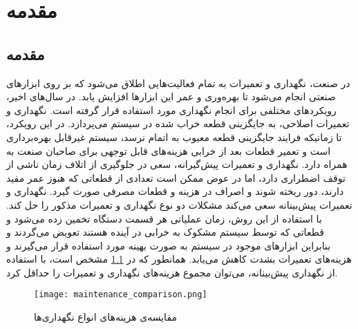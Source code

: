 \chapter{مقدمه}

\section{مقدمه}
در صنعت، نگهداری و تعمیرات به تمام فعالیت‌هایی اطلاق می‌شود که بر روی ابزارهای صنعتی انجام می‌شود تا بهره‌وری و عمر این ابزارها افزایش یابد. در سال‌های اخیر، رویکردهای مختلفی برای انجام نگهداری مورد استفاده قرار گرفته است. نگهداری و تعمیرات اصلاحی، به جایگزینی قطعه خراب شده در سیستم می‌پردازد. در این رویکرد، تا زمانیکه فرایند جایگزینی قطعه معیوب به اتمام نرسد، سیستم غیرقابل بهره‌برداری است و تعمیر قطعات بعد از خرابی هزینه‌های قابل توجهی برای صاحبان صنعت به همراه دارد. نگهداری و تعمیرات پیش‌گیرانه، سعی در جلوگیری از اتلاف زمان ناشی از توقف اضطراری دارد، اما در عوض ممکن است تعدادی از قطعاتی که هنوز عمر مفید دارند، دور ریخته شوند و اصراف در هزینه و قطعات مصرفی صورت گیرد. نگهداری و تعمیرات پیش‌بینانه سعی می‌کند مشکلات دو نوع نگهداری و تعمیرات مذکور را حل کند. با استفاده از این روش، زمان عملیاتی هر قسمت دستگاه تخمین زده می‌شود و قطعاتی که توسط سیستم مشکوک به خرابی در آینده هستند تعویض می‌گردند و بنابراین ابزارهای موجود در سیستم به صورت بهینه مورد استفاده قرار می‌گیرند و هزینه‌های تعمیرات بشدت کاهش می‌یابد. همانطور که در \cref{fig:maintenance_comparison} مشخص است، با استفاده از نگهداری پیش‌بینانه، می‌توان مجموع هزینه‌های نگهداری و تعمیرات را حداقل کرد.

\begin{figure}[!h]
\centerline{\texttt{[image: maintenance\_comparison.png]}}
\caption{مقایسه‌ی هزینه‌های انواع نگهد‌اری‌ها}
\label{fig:maintenance_comparison}
\end{figure}


